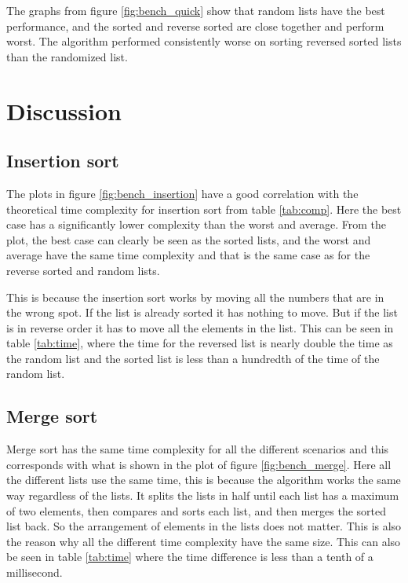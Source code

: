 \documentclass[sigconf, nonacm, natbib, screen, balance=False, 9.5pt]{acmart}
\begin{document}
The graphs from figure \ref{fig:bench_quick} show that random lists have the best performance, and the sorted and reverse sorted are close together and perform worst. The algorithm performed consistently worse on sorting reversed sorted lists than the randomized list. 

\section{Discussion}\label{sec:discussion}

\subsection{Insertion sort}

The plots in figure \ref{fig:bench_insertion} have a good correlation with the theoretical time complexity for insertion sort from table \ref{tab:comp}. Here the best case has a significantly lower complexity than the worst and average. From the plot, the best case can clearly be seen as the sorted lists, and the worst and average have the same time complexity and that is the same case as for the reverse sorted and random lists. 

This is because the insertion sort works by moving all the numbers that are in the wrong spot. If the list is already sorted it has nothing to move. But if the list is in reverse order it has to move all the elements in the list. This can be seen in table  \ref{tab:time}, where the time for the reversed list is nearly double the time as the random list and the sorted list is less than a hundredth of the time of the random list.

\subsection{Merge sort}

Merge sort has the same time complexity for all the different scenarios and this corresponds with what is shown in the plot of figure \ref{fig:bench_merge}. Here all the different lists use the same time, this is because the algorithm works the same way regardless of the lists. It splits the lists in half until each list has a maximum of two elements, then compares and sorts each list, and then merges the sorted list back. So the arrangement of elements in the lists does not matter. This is also the reason why all the different time complexity have the same size. This can also be seen in table \ref{tab:time} where the time difference is less than a tenth of a millisecond. 
\end{document}
